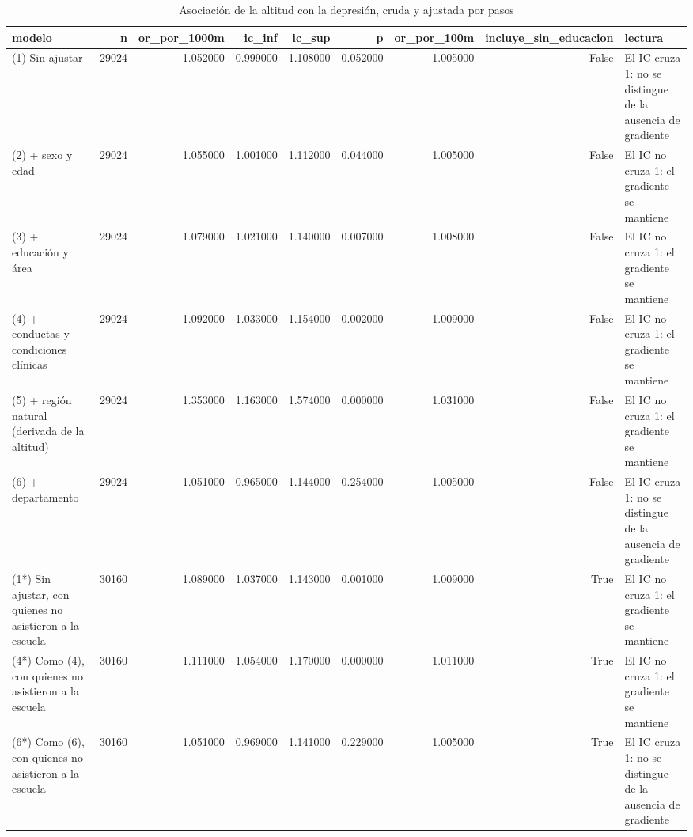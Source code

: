 \begin{table}[htbp]
\caption{Asociación de la altitud con la depresión, cruda y ajustada por pasos}
\label{tab:tabla_60_altitud_cruda_vs_ajustada}
\begin{tabular}{lrrrrrrrl}
\toprule
modelo & n & or\_por\_1000m & ic\_inf & ic\_sup & p & or\_por\_100m & incluye\_sin\_educacion & lectura \\
\midrule
(1) Sin ajustar & 29024 & 1.052000 & 0.999000 & 1.108000 & 0.052000 & 1.005000 & False & El IC cruza 1: no se distingue de la ausencia de gradiente \\
(2) + sexo y edad & 29024 & 1.055000 & 1.001000 & 1.112000 & 0.044000 & 1.005000 & False & El IC no cruza 1: el gradiente se mantiene \\
(3) + educación y área & 29024 & 1.079000 & 1.021000 & 1.140000 & 0.007000 & 1.008000 & False & El IC no cruza 1: el gradiente se mantiene \\
(4) + conductas y condiciones clínicas & 29024 & 1.092000 & 1.033000 & 1.154000 & 0.002000 & 1.009000 & False & El IC no cruza 1: el gradiente se mantiene \\
(5) + región natural (derivada de la altitud) & 29024 & 1.353000 & 1.163000 & 1.574000 & 0.000000 & 1.031000 & False & El IC no cruza 1: el gradiente se mantiene \\
(6) + departamento & 29024 & 1.051000 & 0.965000 & 1.144000 & 0.254000 & 1.005000 & False & El IC cruza 1: no se distingue de la ausencia de gradiente \\
(1*) Sin ajustar, con quienes no asistieron a la escuela & 30160 & 1.089000 & 1.037000 & 1.143000 & 0.001000 & 1.009000 & True & El IC no cruza 1: el gradiente se mantiene \\
(4*) Como (4), con quienes no asistieron a la escuela & 30160 & 1.111000 & 1.054000 & 1.170000 & 0.000000 & 1.011000 & True & El IC no cruza 1: el gradiente se mantiene \\
(6*) Como (6), con quienes no asistieron a la escuela & 30160 & 1.051000 & 0.969000 & 1.141000 & 0.229000 & 1.005000 & True & El IC cruza 1: no se distingue de la ausencia de gradiente \\
\bottomrule
\end{tabular}
\end{table}
